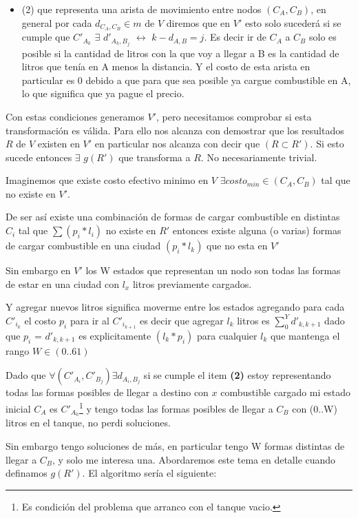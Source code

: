 \documentclass[12pt]{article}
\begin{document}
\begin{itemize}
	\item (2) que representa una arista de movimiento entre nodos $(C_A, C_B)$, en general por cada $d_{C_A,C_B} \in m$ de $V$ diremos que en $V'$ esto solo sucederá si se cumple que $C'_{A_k}$ $\exists$ $d'_{A_k,B_j}$ $\leftrightarrow$  $k - d_{A,B} = j$. Es decir ir de $C_A$ a $C_B$ solo es posible si la cantidad de litros con la que voy a llegar a B es la cantidad de litros que tenía en A menos la distancia. Y el costo de esta arista en particular es $0$ debido a que para que sea posible ya cargue combustible en A, lo que significa que ya pague el precio.
\end{itemize}

Con estas condiciones generamos $V'$, pero necesitamos comprobar si esta transformación es válida. Para ello nos alcanza con demostrar que los resultados $R$ de $V$ existen en $V'$ en particular nos alcanza con decir que $(R \subset R')$. Si esto sucede entonces $\exists$ $g(R')$ que transforma a $R$. No necesariamente trivial.

Imaginemos que existe costo efectivo minimo en $V$  $\exists costo_{min} \in (C_A,C_B)$ tal que no existe en $V'$.

De ser así existe una combinación de formas de cargar combustible en distintas $C_i$ tal que $\sum (p_i * l_i)$ no existe en $R'$ entonces existe alguna (o varias) formas de cargar combustible en una ciudad $(p_i * l_k)$ que no esta en $V'$

Sin embargo en $V'$ los W estados que representan un nodo son todas las formas de estar en una ciudad con $l_x$ litros previamente cargados.

Y agregar nuevos litros significa moverme entre los estados agregando para cada $C'_{i_k}$ el costo $p_i$ para ir al $C'_{i_{k+1}}$ es decir que agregar $l_k$ litros es $\sum_0^Y d'_{k,k+1}$ dado que $p_i$ = $d'_{k,k+1}$ es explicitamente $(l_k * p_i)$ para cualquier $l_k$ que mantenga el rango $W \in (0..61)$

Dado que $\forall (C'_{A_i}, C'_{B_j}) \exists d_{A_i,B_j}$ si se cumple el item \textbf{(2)} estoy representando todas las formas posibles de llegar a destino con $x$ combustible cargado mi estado inicial $C_A$ es $C'_{A_0}$\footnote{Es condición del problema que arranco con el tanque vacio.} y tengo todas las formas posibles de llegar a $C_{B}$ con (0..W) litros en el tanque, no perdi soluciones.

Sin embargo tengo soluciones de más, en particular tengo W formas distintas de llegar a $C_B$, y solo me interesa una. Abordaremos este tema en detalle cuando definamos $g(R')$. El algoritmo sería el siguiente:
\end{document}

